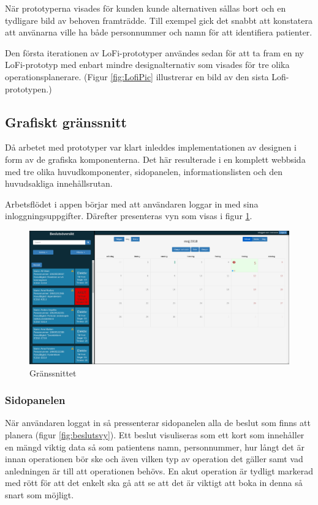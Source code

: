 När prototyperna visades för kunden kunde alternativen sållas bort och en tydligare bild av behoven framträdde.
Till exempel gick det snabbt att konstatera att använarna ville ha både personnummer och namn för att identifiera patienter.

Den första iterationen av LoFi-prototyper användes sedan för att ta fram en ny
LoFi-prototyp med enbart mindre designalternativ som visades för tre olika
operationsplanerare. (Figur \ref{fig:LofiPic} illustrerar en bild av den sista Lofi-prototypen.)

\subsection{Grafiskt gränssnitt}
Då arbetet med prototyper var klart inleddes implementationen av designen i form av de grafiska komponenterna. Det här resulterade i en komplett webbsida med tre olika huvudkomponenter, sidopanelen, informationslisten och den huvudsakliga innehållsrutan.

Arbetsflödet i appen börjar med att användaren loggar in med sina inloggningsuppgifter. Därefter presenteras vyn som visas i figur \ref{fig:window}.

\begin{figure}
	\includegraphics[width=\linewidth]{Figures/window.png}
	\caption{Gränssnittet}
	\label{fig:window}
\end{figure}


\subsubsection{Sidopanelen}
När användaren loggat in så pressenterar sidopanelen alla de beslut som finns att planera (figur \ref{fig:beslutsvy}). Ett beslut visuliseras som ett kort som innehåller en mängd viktig data så som patientens namn, personnummer, hur långt det är innan operationen bör ske och även vilken typ av operation det gäller samt vad anledningen är till att operationen behövs. En akut operation är tydligt markerad med rött för att det enkelt ska gå att se att det är viktigt att boka in denna så snart som möjligt.

